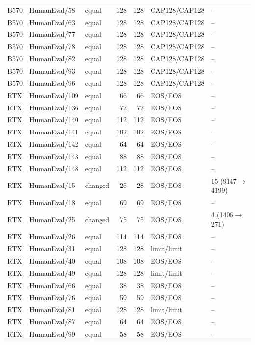 \begin{longtable}{@{}lllrrll@{}}
B570 & HumanEval/58 & equal & 128 & 128 & CAP128/CAP128 & -- \\
B570 & HumanEval/63 & equal & 128 & 128 & CAP128/CAP128 & -- \\
B570 & HumanEval/77 & equal & 128 & 128 & CAP128/CAP128 & -- \\
B570 & HumanEval/78 & equal & 128 & 128 & CAP128/CAP128 & -- \\
B570 & HumanEval/82 & equal & 128 & 128 & CAP128/CAP128 & -- \\
B570 & HumanEval/93 & equal & 128 & 128 & CAP128/CAP128 & -- \\
B570 & HumanEval/96 & equal & 128 & 128 & CAP128/CAP128 & -- \\
RTX & HumanEval/109 & equal & 66 & 66 & EOS/EOS & -- \\
RTX & HumanEval/136 & equal & 72 & 72 & EOS/EOS & -- \\
RTX & HumanEval/140 & equal & 112 & 112 & EOS/EOS & -- \\
RTX & HumanEval/141 & equal & 102 & 102 & EOS/EOS & -- \\
RTX & HumanEval/142 & equal & 64 & 64 & EOS/EOS & -- \\
RTX & HumanEval/143 & equal & 88 & 88 & EOS/EOS & -- \\
RTX & HumanEval/148 & equal & 112 & 112 & EOS/EOS & -- \\
RTX & HumanEval/15 & changed & 25 & 28 & EOS/EOS & 15 (9147$\to$4199) \\
RTX & HumanEval/18 & equal & 69 & 69 & EOS/EOS & -- \\
RTX & HumanEval/25 & changed & 75 & 75 & EOS/EOS & 4 (1406$\to$271) \\
RTX & HumanEval/26 & equal & 114 & 114 & EOS/EOS & -- \\
RTX & HumanEval/31 & equal & 128 & 128 & limit/limit & -- \\
RTX & HumanEval/40 & equal & 108 & 108 & EOS/EOS & -- \\
RTX & HumanEval/49 & equal & 128 & 128 & limit/limit & -- \\
RTX & HumanEval/66 & equal & 38 & 38 & EOS/EOS & -- \\
RTX & HumanEval/76 & equal & 59 & 59 & EOS/EOS & -- \\
RTX & HumanEval/81 & equal & 128 & 128 & limit/limit & -- \\
RTX & HumanEval/87 & equal & 64 & 64 & EOS/EOS & -- \\
RTX & HumanEval/99 & equal & 58 & 58 & EOS/EOS & -- \\

\end{longtable}
